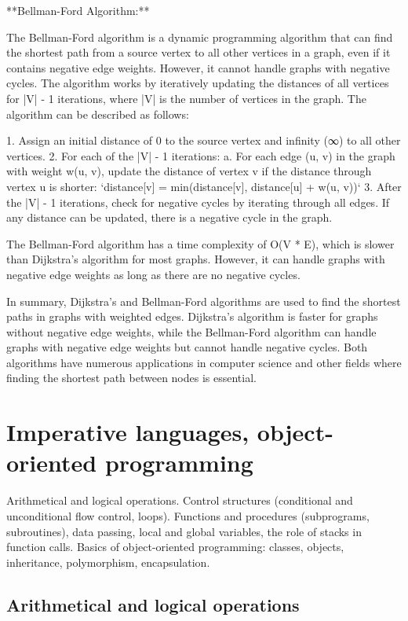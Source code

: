 \documentclass{article}
\begin{document}
**Bellman-Ford Algorithm:**

The Bellman-Ford algorithm is a dynamic programming algorithm that can find the shortest path from a source vertex to all other vertices in a graph, even if it contains negative edge weights. However, it cannot handle graphs with negative cycles. The algorithm works by iteratively updating the distances of all vertices for |V| - 1 iterations, where |V| is the number of vertices in the graph. The algorithm can be described as follows:

1. Assign an initial distance of 0 to the source vertex and infinity (∞) to all other vertices.
2. For each of the |V| - 1 iterations:
   a. For each edge (u, v) in the graph with weight w(u, v), update the distance of vertex v if the distance through vertex u is shorter: `distance[v] = min(distance[v], distance[u] + w(u, v))`
3. After the |V| - 1 iterations, check for negative cycles by iterating through all edges. If any distance can be updated, there is a negative cycle in the graph.

The Bellman-Ford algorithm has a time complexity of O(V * E), which is slower than Dijkstra's algorithm for most graphs. However, it can handle graphs with negative edge weights as long as there are no negative cycles.

In summary, Dijkstra's and Bellman-Ford algorithms are used to find the shortest paths in graphs with weighted edges. Dijkstra's algorithm is faster for graphs without negative edge weights, while the Bellman-Ford algorithm can handle graphs with negative edge weights but cannot handle negative cycles. Both algorithms have numerous applications in computer science and other fields where finding the shortest path between nodes is essential.


\section{Imperative languages, object-oriented programming}

Arithmetical and logical operations. Control structures (conditional and unconditional flow control, loops). Functions and procedures (subprograms, subroutines), data passing, local and global variables, the role of stacks in function calls. Basics of object-oriented programming: classes, objects, inheritance, polymorphism, encapsulation.


\subsection{Arithmetical and logical operations}
\end{document}
